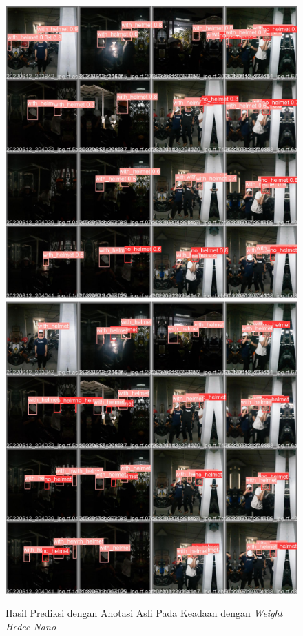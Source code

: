 \begin{figure}[ht]
  \centering
  \includegraphics[scale=0.1]{gambar/train_v2_val/low_ligjt/customNano/val_batch0_pred.jpg}
  \includegraphics[scale=0.1]{gambar/train_v2_val/low_ligjt/customNano/val_batch0_labels.jpg}
  \caption{Hasil Prediksi dengan Anotasi Asli Pada Keadaan dengan \emph{Weight Hedec Nano}}
\end{figure}

